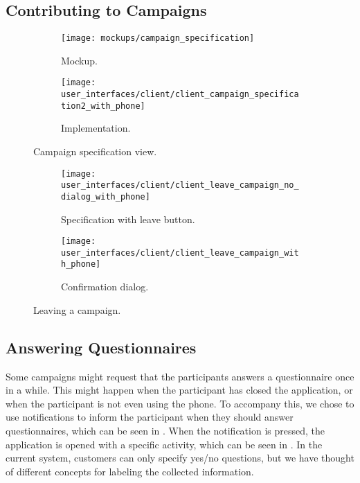 \subsection{Contributing to Campaigns}



\begin{figure}[!htbp]
\begin{subfigure}[!t]{.48\textwidth}
  \centering
  \texttt{[image: mockups/campaign\_specification]}
  \caption{Mockup.}
  \label{fig:mockup_campaign_specification}
\end{subfigure}%
\begin{subfigure}[!t]{.52\textwidth}
  \centering
  \texttt{[image: user\_interfaces/client/client\_campaign\_specification2\_with\_phone]}
  \caption{Implementation.}
  \label{fig:implementation_campaign_specification}
\end{subfigure}
\caption{Campaign specification view.}
\label{fig:campaign_specification}
\end{figure}
\FloatBarrier

\begin{figure}[!htbp]
\begin{subfigure}[!t]{.50\textwidth}
  \centering
  \texttt{[image: user\_interfaces/client/client\_leave\_campaign\_no\_dialog\_with\_phone]}
  \caption{Specification with leave button.}
  \label{fig:leave_campaign_no_dialog}
\end{subfigure}%
\begin{subfigure}[!t]{.50\textwidth}
  \centering
  \texttt{[image: user\_interfaces/client/client\_leave\_campaign\_with\_phone]}
  \caption{Confirmation dialog.}
  \label{fig:leave_campaign_dialog}
\end{subfigure}
\caption{Leaving a campaign.}
\label{fig:leave_campaign}
\end{figure}
\FloatBarrier

\subsection{Answering Questionnaires}

Some campaigns might request that the participants answers a questionnaire once in a while. This might happen when the participant has closed the application, or when the participant is not even using the phone. To accompany this, we chose to use notifications to inform the participant when they should answer questionnaires, which can be seen in . When the notification is pressed, the application is opened with a specific activity, which can be seen in . In the current system, customers can only specify yes/no questions, but we have thought of different concepts for labeling the collected information.

